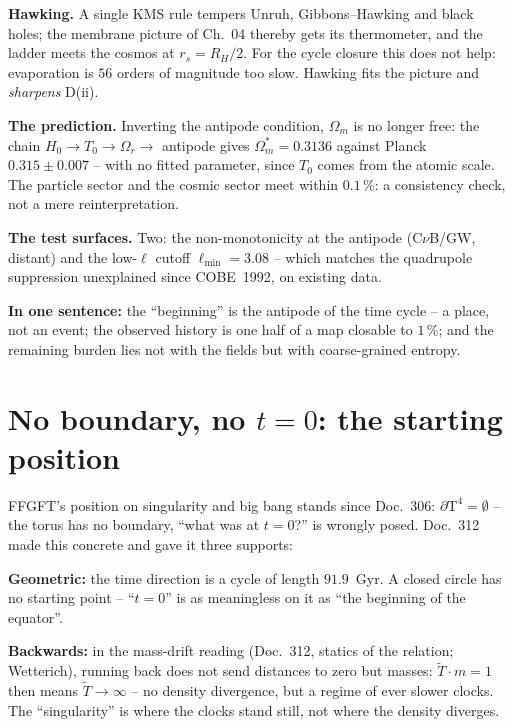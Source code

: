 \documentclass[11pt]{report}
\begin{document}
\textbf{Hawking.} A single KMS rule tempers Unruh,
Gibbons--Hawking and black holes; the membrane picture of Ch.~04
thereby gets its thermometer, and the ladder meets the cosmos at
$r_s = R_H/2$. For the cycle closure this does not help:
evaporation is $56$ orders of magnitude too slow. Hawking fits the
picture and \emph{sharpens} D(ii).

\textbf{The prediction.} Inverting the antipode condition,
$\Omega_m$ is no longer free: the chain
$H_0 \to T_0 \to \Omega_r \to$ antipode gives
$\Omega_m^{*} = 0.3136$ against Planck $0.315\pm0.007$ -- with no
fitted parameter, since $T_0$ comes from the atomic scale. The
particle sector and the cosmic sector meet within $0.1\,\%$: a
consistency check, not a mere reinterpretation.

\textbf{The test surfaces.} Two: the non-monotonicity at the
antipode (C$\nu$B/GW, distant) and the low-$\ell$ cutoff
$\ell_\text{min} = 3.08$ -- which matches the quadrupole
suppression unexplained since COBE~1992, on existing data.

\medskip
\noindent\textbf{In one sentence:} the \enquote{beginning} is the
antipode of the time cycle -- a place, not an event; the observed
history is one half of a map closable to $1\,\%$; and the
remaining burden lies not with the fields but with coarse-grained
entropy.

\chapter{No boundary, no $t=0$: the starting position}

FFGFT's position on singularity and big bang stands since
Doc.~306: $\partial\text{T}^4 = \emptyset$ -- the torus has no
boundary, \enquote{what was at $t=0$?} is wrongly posed. Doc.~312
made this concrete and gave it three supports:

\textbf{Geometric:} the time direction is a cycle of length
$91.9$~Gyr. A closed circle has no starting point --
\enquote{$t=0$} is as meaningless on it as \enquote{the beginning
of the equator}.

\textbf{Backwards:} in the mass-drift reading (Doc.~312, statics
of the relation; Wetterich), running back does not send distances
to zero but masses: $\tilde T \cdot m = 1$ then means
$\tilde T \to \infty$ -- no density divergence, but a regime of
ever slower clocks. The \enquote{singularity} is where the clocks
stand still, not where the density diverges.
\end{document}
